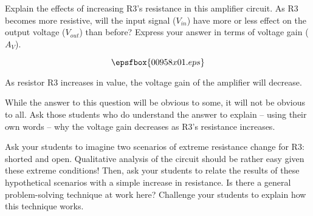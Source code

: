 

Explain the effects of increasing R3's resistance in this amplifier circuit.  As R3 becomes more resistive, will the input signal ($V_{in}$) have more or less effect on the output voltage ($V_{out}$) than before?  Express your answer in terms of voltage gain ($A_V$).

$$\epsfbox{00958x01.eps}$$







As resistor R3 increases in value, the voltage gain of the amplifier will decrease.







While the answer to this question will be obvious to some, it will not be obvious to all.  Ask those students who do understand the answer to explain -- using their own words -- why the voltage gain decreases as R3's resistance increases.

Ask your students to imagine two scenarios of extreme resistance change for R3: shorted and open.  Qualitative analysis of the circuit should be rather easy given these extreme conditions!  Then, ask your students to relate the results of these hypothetical scenarios with a simple increase in resistance.  Is there a general problem-solving technique at work here?  Challenge your students to explain how this technique works.




